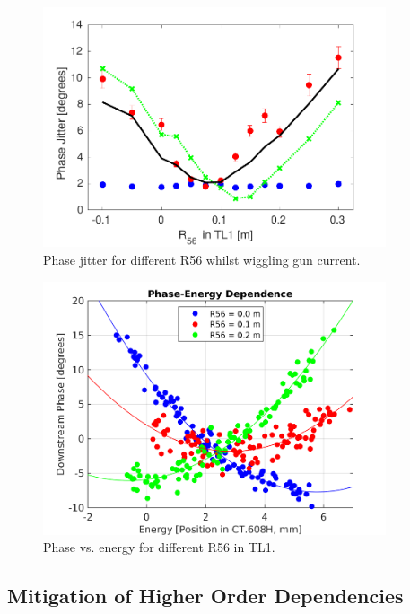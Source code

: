 \begin{figure}
  \centering
  \includegraphics[width=0.9\textwidth]{Figures/propagation/R56ScanGunWiggle_PhaseJitter}
  \caption{Phase jitter for different R56 whilst wiggling gun current.}
  \label{f:R56ScanGunWiggle_PhaseJitter}
\end{figure}

\begin{figure}
  \centering
  \includegraphics[width=0.9\textwidth]{Figures/propagation/R56ScanGunWiggle_Vs608}
  \caption{Phase vs. energy for different R56 in TL1.}
  \label{f:R56ScanGunWiggle_Vs608}
\end{figure}

\subsection{Mitigation of Higher Order Dependencies}
\label{ss:t566Mitigation}



